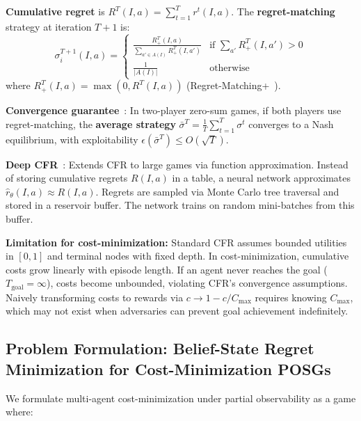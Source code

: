 \documentclass{article}
\begin{document}
\textbf{Cumulative regret} is $R^T(I, a) = \sum_{t=1}^T r^t(I, a)$. The \textbf{regret-matching} strategy at iteration $T+1$ is:
\begin{equation}
\sigma_i^{T+1}(I, a) = \begin{cases}
\frac{R_+^T(I, a)}{\sum_{a' \in A(I)} R_+^T(I, a')} & \text{if } \sum_{a'} R_+^T(I, a') > 0 \\
\frac{1}{|A(I)|} & \text{otherwise}
\end{cases}
\end{equation}
where $R_+^T(I, a) = \max(0, R^T(I, a))$ (Regret-Matching+~\cite{tammelin2014solving}).

\textbf{Convergence guarantee}~\cite{zinkevich2007regret}: In two-player zero-sum games, if both players use regret-matching, the \textbf{average strategy} $\bar{\sigma}^T = \frac{1}{T}\sum_{t=1}^T \sigma^t$ converges to a Nash equilibrium, with exploitability $\epsilon(\bar{\sigma}^T) \leq O(\sqrt{T})$.

\textbf{Deep CFR}~\cite{brown2019deep}: Extends CFR to large games via function approximation. Instead of storing cumulative regrets $R(I,a)$ in a table, a neural network approximates $\hat{r}_\theta(I, a) \approx R(I,a)$. Regrets are sampled via Monte Carlo tree traversal and stored in a reservoir buffer. The network trains on random mini-batches from this buffer.

\textbf{Limitation for cost-minimization:} Standard CFR assumes bounded utilities in $[0,1]$ and terminal nodes with fixed depth. In cost-minimization, cumulative costs grow linearly with episode length. If an agent never reaches the goal ($T_{\text{goal}} = \infty$), costs become unbounded, violating CFR's convergence assumptions. Naively transforming costs to rewards via $c \to 1 - c/C_{\max}$ requires knowing $C_{\max}$, which may not exist when adversaries can prevent goal achievement indefinitely.

\subsection{Problem Formulation: Belief-State Regret Minimization for Cost-Minimization POSGs}

We formulate multi-agent cost-minimization under partial observability as a game where:
\end{document}
